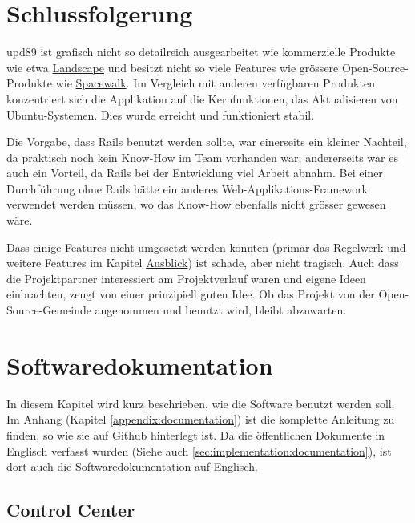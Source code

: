 \section{Schlussfolgerung}
\label{conclusion}

\gls{upd89} ist grafisch nicht so detailreich ausgearbeitet wie kommerzielle Produkte wie etwa \hyperref[sec:analysis:competition:landscape]{Landscape} und besitzt nicht so viele Features wie grössere Open-Source-Produkte wie \hyperref[sec:analysis:competition:spacewalk]{Spacewalk}. Im Vergleich mit anderen verfügbaren Produkten konzentriert sich die Applikation auf die Kernfunktionen, das Aktualisieren von Ubuntu-Systemen. Dies wurde erreicht und funktioniert stabil.

Die Vorgabe, dass Rails benutzt werden sollte, war einerseits ein kleiner Nachteil, da praktisch noch kein Know-How im Team vorhanden war; andererseits war es auch ein Vorteil, da Rails bei der Entwicklung viel Arbeit abnahm. Bei einer Durchführung ohne Rails hätte ein anderes Web-Applikations-Framework verwendet werden müssen, wo das Know-How ebenfalls nicht grösser gewesen wäre.

Dass einige Features nicht umgesetzt werden konnten (primär das \hyperref[sec:ausblick:regelwerk]{Regelwerk} und weitere Features im Kapitel \hyperref[sec:ausblick]{Ausblick}) ist schade, aber nicht tragisch. Auch dass die Projektpartner interessiert am Projektverlauf waren und eigene Ideen einbrachten, zeugt von einer prinzipiell guten Idee. Ob das Projekt von der Open-Source-Gemeinde angenommen und benutzt wird, bleibt abzuwarten.

\xxx

\section{Softwaredokumentation} \label{documentation}

In diesem Kapitel wird kurz beschrieben, wie die Software benutzt werden soll. Im Anhang (Kapitel \ref{appendix:documentation}) ist die komplette Anleitung zu finden, so wie sie auf Github hinterlegt ist. Da die öffentlichen Dokumente in Englisch verfasst wurden (Siehe auch \ref{sec:implementation:documentation}), ist dort auch die Softwaredokumentation auf Englisch.

\subsection*{Control Center}

